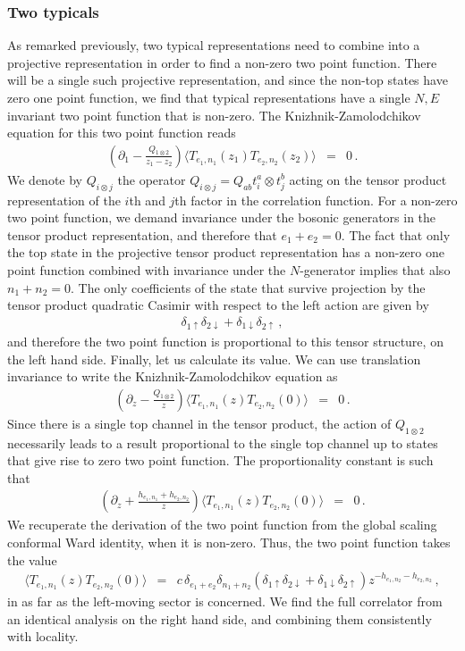 \documentclass[12pt]{article}
\numberwithin{equation}{section}
\numberwithin{equation}{section}
\numberwithin{table}{section}\setlength{\multlinegap}{25pt}
\begin{document}
\subsubsection{Two typicals}
As remarked previously, two typical representations need to combine into a projective representation in order to find
a non-zero two point function. There will be a single such projective representation, and since the non-top states have zero 
one point function, we find that typical representations
have a single $N,E$ invariant two point function that is non-zero.
The Knizhnik-Zamolodchikov equation for this two point function reads
\begin{eqnarray}
(\partial_1 - \frac{Q_{1 \otimes 2}}{z_1-z_2}) \langle T_{e_1,n_1}(z_1) T_{e_2,n_2}(z_2) \rangle &=& 0 \, .
\end{eqnarray}
We denote by $Q_{i \otimes j}$ the operator $Q_{i \otimes j}= Q_{ab} t^a_i \otimes t^b_j$ acting on
the tensor product representation of the $i$th and $j$th factor in the correlation function.
For a non-zero two point function, we demand invariance under the bosonic generators in the tensor
product representation, and therefore that $e_1+e_2 =0$. The fact that only the top state in the projective
tensor product representation has a non-zero one point function combined with invariance
under the $N$-generator implies that also $n_1+n_2=0$.
The only coefficients of the state that survive projection by the tensor product quadratic Casimir with respect to the left action are given
by
\begin{eqnarray}
\delta_{1 \uparrow} \delta_{2 \downarrow}+\delta_{1 \downarrow} \delta_{2 \uparrow} \, ,
\end{eqnarray}
and therefore the two point function is proportional to this tensor structure, on the left hand side.
Finally, let us calculate its value.
We can use translation invariance to write the Knizhnik-Zamolodchikov equation as
\begin{eqnarray}
(\partial_z - \frac{Q_{1 \otimes 2}}{z}) \langle T_{e_1,n_1} (z) T_{e_2,n_2}(0) \rangle &=& 0 \, .
\end{eqnarray}
Since there is a single top channel in the tensor product, the action of $Q_{1 \otimes 2}$ necessarily
leads to a result proportional to the single top channel up to states that give rise to zero
two point function. The proportionality constant is such that
\begin{eqnarray}
(\partial_z + \frac{h_{e_1,n_1}+h_{e_2,n_2}}{z}) \langle T_{e_1,n_1} (z) T_{e_2,n_2}(0) \rangle &=& 0 \, .
\end{eqnarray}
We recuperate the derivation of the two point function from the global scaling conformal Ward identity,
when it is non-zero. 
Thus, the two point function takes the value
\begin{eqnarray}
 \langle T_{e_1,n_1} (z) T_{e_2,n_2}(0) \rangle &=& c \, \delta_{e_1+e_2} \delta_{n_1+n_2} (\delta_{1 \uparrow} \delta_{2 \downarrow}+\delta_{1 \downarrow} \delta_{2 \uparrow})
z^{-h_{e_1,n_2}-h_{e_2,n_2}}
\, ,
\end{eqnarray}
in as far as the left-moving sector is concerned. We find the full correlator from an identical analysis on the right hand side, and combining them
 consistently with locality.
\end{document}
